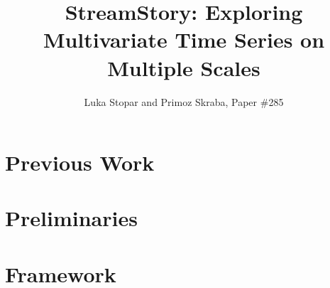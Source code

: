 \documentclass[journal]{vgtc}                %
\title{StreamStory: Exploring Multivariate Time Series on Multiple Scales}
\author{Luka Stopar and Primoz Skraba, Paper \#285}
\theoremstyle{definition}
\begin{document}

\maketitle

\label{sec:introduction}





\section{Previous Work}
\label{sec:previous}


\section{Preliminaries}


\section{Framework}
\label{sec:multiscale-framework}

\end{document}
